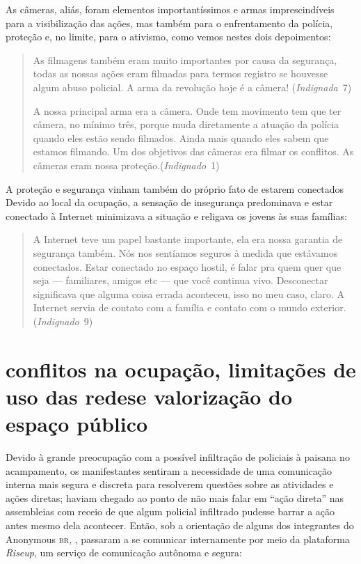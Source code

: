 As câmeras, aliás, foram elementos importantíssimos e armas
imprescindíveis para a visibilização das ações, mas também para o
enfrentamento da polícia, proteção e, no limite, para o ativismo, como
vemos nestes dois depoimentos:

\begin{quote}
As filmagens também eram muito importantes por causa da segurança, todas
as nossas ações eram filmadas para termos registro se houvesse algum
abuso policial. A arma da revolução hoje é a câmera! (\textit{Indignada}~7)

A nossa principal arma era a câmera. Onde tem movimento tem que ter
câmera, no mínimo três, porque muda diretamente a atuação da polícia
quando eles estão sendo filmados. Ainda mais quando eles sabem que
estamos filmando. Um dos objetivos das câmeras era filmar os conflitos.
As câmeras eram nossa proteção.(\textit{Indignado}~1)
\end{quote}

A proteção e segurança vinham também do próprio fato de estarem
conectados Devido ao local da ocupação, a sensação de insegurança
predominava e estar conectado à Internet minimizava a situação e
religava os jovens às suas famílias:

\begin{quote}
A Internet teve um papel bastante importante, ela era nossa garantia de
segurança também. Nós nos sentíamos seguros à medida que estávamos
conectados. Estar conectado no espaço hostil, é falar pra quem quer que
seja --- familiares, amigos etc --- que você continua vivo. Desconectar
significava que alguma coisa errada aconteceu, isso no meu caso, claro.
A Internet servia de contato com a família e contato com o mundo
exterior. (\textit{Indignado}~9)
\end{quote}

\section{conflitos na ocupação, limitações de uso das redes\break e valorização do espaço público}

Devido à grande preocupação com a possível infiltração de policiais à
paisana no acampamento, os manifestantes sentiram a necessidade de
uma comunicação interna mais segura e discreta para resolverem questões
sobre as atividades e ações diretas; haviam chegado ao ponto de não mais
falar em ``ação direta'' nas assembleias com receio de que algum
policial infiltrado pudesse barrar a ação antes mesmo dela acontecer.
Então, sob a orientação de alguns dos integrantes do Anonymous \textsc{br},
, passaram a se comunicar
internamente por meio da plataforma \textit{Riseup}, um serviço de
comunicação autônoma e segura:

